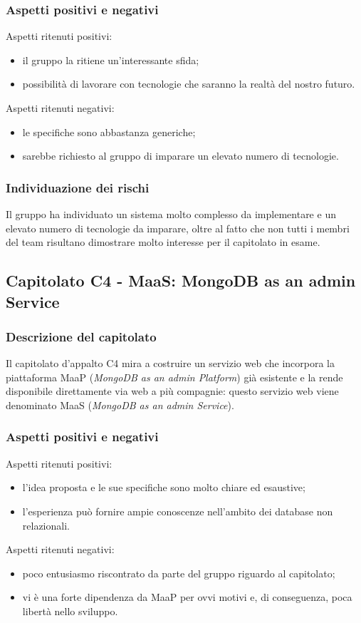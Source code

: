 \documentclass[../StudioDiFattibilita.tex]{subfiles}
\begin{document}
		\subsubsection{Aspetti positivi e negativi}
		Aspetti ritenuti positivi:
			\begin{itemize}
				\item il gruppo la ritiene un'interessante sfida;
				\item possibilità di lavorare con tecnologie che saranno la realtà del nostro futuro.
			\end{itemize}
		Aspetti ritenuti negativi:
			\begin{itemize}
				\item le specifiche sono abbastanza generiche;
				\item sarebbe richiesto al gruppo di imparare un elevato numero di tecnologie.
			\end{itemize}
		\subsubsection{Individuazione dei rischi}
		Il gruppo ha individuato un sistema molto complesso da implementare e un elevato numero di tecnologie da imparare, oltre al fatto che non tutti i membri del team risultano dimostrare molto interesse per il capitolato in esame.
	\subsection{Capitolato C4 - MaaS: MongoDB as an admin Service}
		\subsubsection{Descrizione del capitolato}
		Il capitolato d'appalto C4 mira a costruire un servizio web che incorpora la piattaforma MaaP (\textit{MongoDB as an admin Platform}) già esistente e la rende disponibile direttamente via web a più compagnie: questo servizio web viene denominato MaaS (\textit{MongoDB as an admin Service}).
		\subsubsection{Aspetti positivi e negativi}
		Aspetti ritenuti positivi:
			\begin{itemize}
				\item l'idea proposta e le sue specifiche sono molto chiare ed esaustive;
				\item l'esperienza può fornire ampie conoscenze nell'ambito dei database non relazionali.
			\end{itemize}
		Aspetti ritenuti negativi:
			\begin{itemize}
				\item poco entusiasmo riscontrato da parte del gruppo riguardo al capitolato;
				\item vi è una forte dipendenza da MaaP per ovvi motivi e, di conseguenza, poca libertà nello sviluppo.
			\end{itemize}
\end{document}
